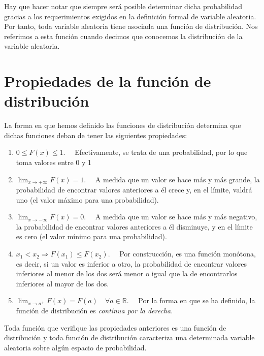 \documentclass[
  a4paper,
  DIV=11,
  numbers=noendperiod]{scrreprt}
\begin{document}
Hay que hacer notar que siempre será posible determinar dicha
probabilidad gracias a los requerimientos exigidos en la definición
formal de variable aleatoria. Por tanto, toda variable aleatoria tiene
asociada una función de distribución. Nos referimos a esta función
cuando decimos que conocemos la distribución de la variable aleatoria.

\section{Propiedades de la función de
distribución}\label{propiedades-de-la-funciuxf3n-de-distribuciuxf3n}

La forma en que hemos definido las funciones de distribución determina
que dichas funciones deban de tener las siguientes propiedades:

\begin{enumerate}
\def\labelenumi{\arabic{enumi}.}
\item
  \(0 \leq F(x) \leq 1. \quad\) Efectivamente, se trata de una
  probabilidad, por lo que toma valores entre 0 y 1
\item
  \(\lim _{x \rightarrow+\infty} F(x)=1. \quad\) A medida que un valor
  se hace más y más grande, la probabilidad de encontrar valores
  anteriores a él crece y, en el límite, valdrá uno (el valor máximo
  para una probabilidad).
\item
  \(\lim _{x \rightarrow-\infty} F(x)=0. \quad\) A medida que un valor
  se hace más y más negativo, la probabilidad de encontrar valores
  anteriores a él disminuye, y en el límite es cero (el valor mínimo
  para una probabilidad).
\item
  \(x_{1}<x_{2} \Rightarrow F\left(x_{1}\right) \leq F\left(x_{2}\right). \quad\)
  Por construcción, es una función monótona, es decir, si un valor es
  inferior a otro, la probabilidad de encontrar valores inferiores al
  menor de los dos será menor o igual que la de encontrarlos inferiores
  al mayor de los dos.
\item
  \(\lim _{x \rightarrow a^{+}} F(x)=F(a) \quad \forall a \in \mathbb{R}. \quad\)
  Por la forma en que se ha definido, la función de distribución es
  \emph{contínua por la derecha}.
\end{enumerate}

Toda función que verifique las propiedades anteriores es una función de
distribución y toda función de distribución caracteriza una determinada
variable aleatoria sobre algún espacio de probabilidad.
\end{document}
